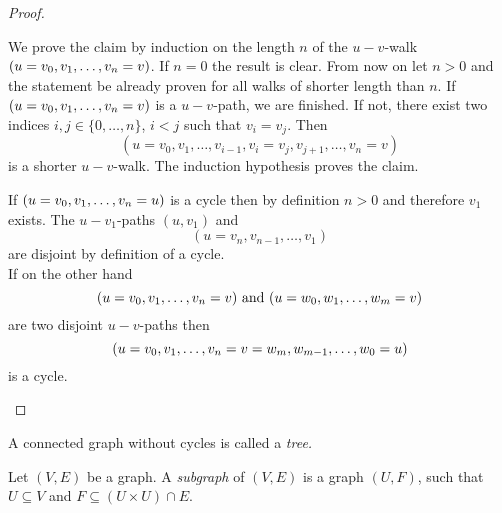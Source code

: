 \begin{proof}
\begin{plist}
\item We prove the claim by induction on the length $n$ of the $u-v$-walk $(u=v_0,\seq{v}=v)$. If $n=0$ the result is clear. From now on let $n>0$ and the statement be already proven for all walks of shorter length than $n$. If $(u=v_0,\seq{v}=v)$ is a $u-v$-path, we are finished. If not, there exist two indices $i,j\in\lbrace 0,\ldots,n\rbrace$, $i<j$ such that $v_i=v_j$. Then
\begin{equation*}
(u=v_0,v_1,\ldots,v_{i-1},v_i=v_j,v_{j+1},\ldots,v_n=v)
\end{equation*}
is a shorter $u-v$-walk. The induction hypothesis proves the claim.
\item If $(u=v_0,\seq{v}=u)$ is a cycle then by definition $n>0$ and therefore $v_1$ exists. The $u-v_1$-paths $(u,v_1)$ and
\[(u=v_n,v_{n-1},\ldots,v_1)\]
are disjoint by definition of a cycle.\\
If on the other hand 
\begin{equation*}
(u=v_0,\seq{v}=v) \text{ and } (u=w_0,\seq[m]{w}=v) 
\end{equation*}
are two disjoint $u-v$-paths then
\begin{equation*}
(u=v_0,\seq{v}=v=w_m,w_{m-1},\ldots,w_0=u)
\end{equation*}
is a cycle.
\end{plist}
\end{proof}

\begin{defin}
A connected graph without cycles is called a \emph{tree.}
\end{defin}


\begin{defin}
Let $(V,E)$ be a graph. A \emph{subgraph} of $(V,E)$ is a graph $(U,F)$, such that $U\subseteq V$ and $F\subseteq (U\times U)\cap E.$
\end{defin}

